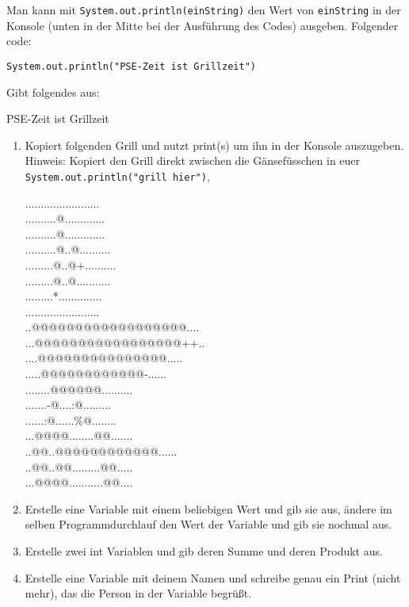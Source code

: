 \documentclass{../../sheet}
\begin{document}
Man kann mit \texttt{System.out.println(einString)} den Wert von \texttt{einString} in der Konsole (unten in der Mitte bei der Ausführung des Codes) ausgeben. Folgender code:
\begin{verbatim}
System.out.println("PSE-Zeit ist Grillzeit")
\end{verbatim}
Gibt folgendes aus:
\begin{ausgabe}
  PSE-Zeit ist Grillzeit
\end{ausgabe}

\begin{enumerate}
  \item Kopiert folgenden Grill und nutzt print(s) um ihn in der Konsole auszugeben.\\
        Hinweis: Kopiert den Grill direkt zwischen die Gänsefüsschen in euer \\\texttt{System.out.println("grill hier")},
        \begin{ausgabe}
          ........................\\
          ..........@.............\\
          ..........@.............\\
          ..........@..@..........\\
          .........@..@+..........\\
          .........@..@...........\\
          .........*..............\\
          ........................\\
          ..@@@@@@@@@@@@@@@@@@....\\
          ...@@@@@@@@@@@@@@@@@++..\\
          ....@@@@@@@@@@@@@@@.....\\
          .....@@@@@@@@@@@@-......\\
          ........@@@@@@..........\\
          .......-@....:@.........\\
          ......:@......\%@........\\
          ...@@@@........@@.......\\
          ..@@..@@@@@@@@@@@@......\\
          ..@@..@@.........@@.....\\
          ...@@@@...........@@....
        \end{ausgabe}
  \item Erstelle eine Variable mit einem beliebigen Wert und gib sie aus, ändere im selben Programmdurchlauf den Wert der Variable und gib sie nochmal aus.
  \item Erstelle zwei int Variablen und gib deren Summe und deren Produkt aus.
  \item Erstelle eine Variable mit deinem Namen und schreibe genau ein Print (nicht mehr), das die Person in der Variable begrüßt.
\end{enumerate}
\end{document}
